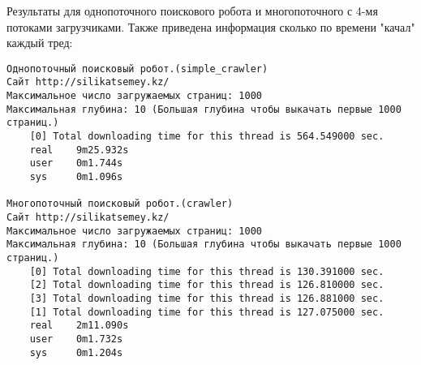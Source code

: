 \documentclass[12pt]{article}
\begin{document}
Результаты для однопоточного поискового робота и многопоточного с 4-мя
потоками загрузчиками. Также приведена информация сколько по времени "качал"
каждый тред:
\begin{verbatim}
Однопоточный поисковый робот.(simple_crawler)
Сайт http://silikatsemey.kz/
Максимальное число загружаемых страниц: 1000
Максимальная глубина: 10 (Большая глубина чтобы выкачать первые 1000 страниц.)
    [0] Total downloading time for this thread is 564.549000 sec.
    real    9m25.932s
    user    0m1.744s
    sys     0m1.096s

Многопоточный поисковый робот.(crawler)
Сайт http://silikatsemey.kz/
Максимальное число загружаемых страниц: 1000
Максимальная глубина: 10 (Большая глубина чтобы выкачать первые 1000 страниц.)
    [0] Total downloading time for this thread is 130.391000 sec.
    [2] Total downloading time for this thread is 126.810000 sec.
    [3] Total downloading time for this thread is 126.881000 sec.
    [1] Total downloading time for this thread is 127.075000 sec.
    real    2m11.090s
    user    0m1.732s
    sys     0m1.204s

\end{verbatim}
\end{document}
